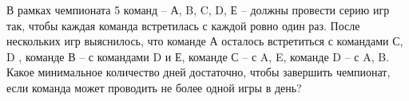 \question
В рамках чемпионата 5 команд – А, B, C, D, Е – должны провести
серию игр так, чтобы каждая команда встретилась с каждой ровно один раз. После нескольких игр выяснилось, что команде А осталось встретиться с командами  С, D , команде В – с командами  D и Е, команде С – с A, E, команде D – с A, B. Какое минимальное количество дней достаточно, чтобы завершить чемпионат, если команда может проводить не более одной игры в день?